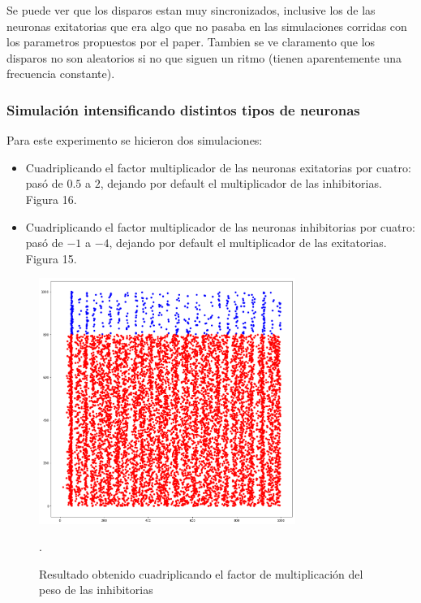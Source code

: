 \documentclass[12pt]{article}
\begin{document}
\newpage

Se puede ver que los disparos estan muy sincronizados, inclusive los de las neuronas exitatorias que era algo que no pasaba en las simulaciones corridas con los parametros propuestos por el paper.
Tambien se ve claramento que los disparos no son aleatorios si no que siguen un ritmo (tienen aparentemente una frecuencia constante).

\subsubsection{Simulación intensificando distintos tipos de neuronas}
Para este experimento se hicieron dos simulaciones:
\begin{itemize}
    \item Cuadriplicando el factor multiplicador de las neuronas exitatorias por cuatro: pasó de $0.5$ a $2$, dejando por default el multiplicador de las inhibitorias. Figura 16.
    \item Cuadriplicando el factor multiplicador de las neuronas inhibitorias por cuatro: pasó de $-1$ a $-4$, dejando por default el multiplicador de las exitatorias. Figura 15.
\end{itemize}

\begin{figure}[htp!]
    \centering
        \includegraphics[height=8cm]{images/resultadoCuadrupleInhibitoria.png}
    \caption[fontsize=2pt]{Resultado obtenido cuadriplicando el factor de multiplicación del peso de las inhibitorias}.
\end{figure}
\end{document}
